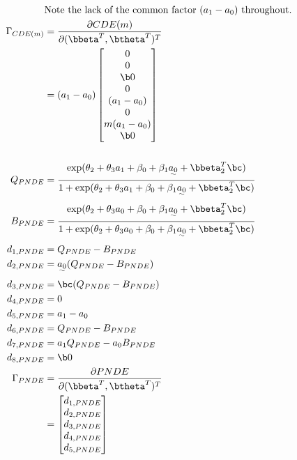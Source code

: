 \documentclass[dvipdfmx,10pt]{article}
\begin{document}
\begin{align*}
  &\text{Note the lack of the common factor $(a_{1} - a_{0})$ throughout.}\\
  \Gamma_{CDE(m)}
  &= \frac{\partial CDE(m)}{\partial (\bbeta^{T},\btheta^{T})^{T}}\\
  &= (a_{1}-a_{0})
    \begin{bmatrix}
      0\\
      0\\
      \b0\\
      0\\
      (a_{1} - a_{0})\\
      0\\
      m(a_{1} - a_{0})\\
      \b0\\
    \end{bmatrix}\\
  \\
  Q_{PNDE} &= \frac
             {    \exp(\theta_{2} + \theta_{3}a_{1} + \beta_{0} + \beta_{1}\uwave{a_{0}} + \bbeta_{2}^{T}\bc)}
             {1 + \exp(\theta_{2} + \theta_{3}a_{1} + \beta_{0} + \beta_{1}\uwave{a_{0}} + \bbeta_{2}^{T}\bc)}\\
  B_{PNDE} &= \frac
             {    \exp(\theta_{2} + \theta_{3}a_{0} + \beta_{0} + \beta_{1}\uwave{a_{0}} + \bbeta_{2}^{T}\bc)}
             {1 + \exp(\theta_{2} + \theta_{3}a_{0} + \beta_{0} + \beta_{1}\uwave{a_{0}} + \bbeta_{2}^{T}\bc)}\\
      d_{1,PNDE} &= Q_{PNDE} - B_{PNDE}\\
      d_{2,PNDE} &= \uwave{a_{0}} (Q_{PNDE} - B_{PNDE})\\
      d_{3,PNDE} &= \bc (Q_{PNDE} - B_{PNDE})\\
      d_{4,PNDE} &= 0\\
      d_{5,PNDE} &= a_{1} - a_{0}\\
      d_{6,PNDE} &= Q_{PNDE} - B_{PNDE}\\
      d_{7,PNDE} &= a_{1}Q_{PNDE} - a_{0}B_{PNDE}\\
      d_{8,PNDE} &= \b0\\
  \Gamma_{PNDE}
  &= \frac{\partial PNDE}{\partial (\bbeta^{T},\btheta^{T})^{T}}\\
  &= \begin{bmatrix}
      d_{1,PNDE}\\
      d_{2,PNDE}\\
      d_{3,PNDE}\\
      d_{4,PNDE}\\
      d_{5,PNDE}\\

\end{bmatrix}
\end{align*}
\end{document}
